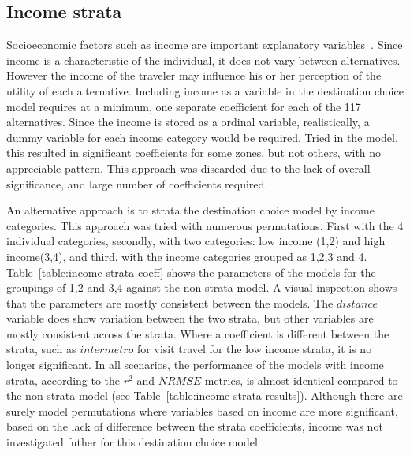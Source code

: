 \subsection{Income strata}
Socioeconomic factors such as income are important explanatory variables~\parencite{kitamura1997micro}. Since income is a characteristic of the individual, it does not vary between alternatives. However the income of the traveler may influence his or her perception of the utility of each alternative. Including income as a variable in the destination choice model requires at a minimum, one separate coefficient for each of the 117 alternatives. Since the income is stored as a ordinal variable, realistically, a dummy variable for each income category would be required. Tried in the model, this resulted in significant coefficients for some zones, but not others, with no appreciable pattern. This approach was discarded due to the lack of overall significance, and large number of coefficients required. 

An alternative approach is to strata the destination choice model by income categories. This approach was tried with numerous permutations. First with the 4 individual categories, secondly, with two categories: low income (1,2) and high income(3,4), and third, with the income categories grouped as {1,2,3} and {4}. Table~\ref{table:income-strata-coeff} shows the parameters of the models for the groupings of {1,2} and {3,4} against the non-strata model. A visual inspection shows that the parameters are mostly consistent between the models. The $distance$ variable does show variation between the two strata, but other variables are mostly consistent across the strata. Where a coefficient is different between the strata, such as $intermetro$ for visit travel for the low income strata, it is no longer significant. In all scenarios, the performance of the models with income strata, according to the $r^2$ and $NRMSE$ metrics, is almost identical compared to the non-strata model (see Table~\ref{table:income-strata-results}). Although there are surely model permutations where variables based on income are more significant, based on the lack of difference between the strata coefficients, income was not investigated futher for this destination choice model. 


